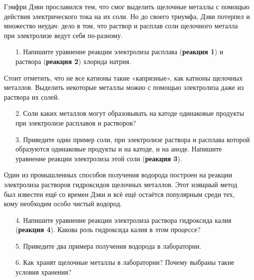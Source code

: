
Гэмфри Дэви прославился тем, что смог выделить щелочные металлы с помощью действия электрического тока на их соли. Но до своего триумфа, Дэви потерпел и множество неудач: дело в том, что раствор и расплав соли щелочного металла при электролизе ведут себя по-разному.
\begin{enumerate}
\item[1.] Напишите уравнение реакции электролиза расплава (\textbf{реакция 1}) и раствора (\textbf{реакция 2}) хлорида натрия. 
\end{enumerate}
Стоит отметить, что не все катионы такие «капризные», как катионы щелочных металлов. Выделить некоторые металлы можно с помощью электролиза даже из раствора их солей.
\begin{enumerate}
\item[2.] Соли каких металлов могут образовывать на катоде одинаковые продукты при электролизе расплавов и растворов? 
\item[3.] Приведите один пример соли, при электролизе раствора и расплава которой образуются одинаковые продукты и на катоде, и на аноде. Напишите уравнение реакции электролиза этой соли (\textbf{реакция 3}).
\end{enumerate}
Один из промышленных способов получения водорода построен на реакции электролиза растворов гидроксидов щелочных металлов. Этот изящный метод был известен ещё со времен Дэви и всё ещё остаётся популярным среди тех, кому необходим особо чистый водород.
\begin{enumerate}
\item[4.] Напишите уравнение реакции электролиза раствора гидроксида калия (\textbf{реакция 4}). Какова роль гидроксида калия в этом процессе?
\item[5.] Приведите два примера получения водорода в лаборатории.
\item[6.] Как хранят щелочные металлы в лаборатории? Почему выбраны такие условия хранения?
\end{enumerate}